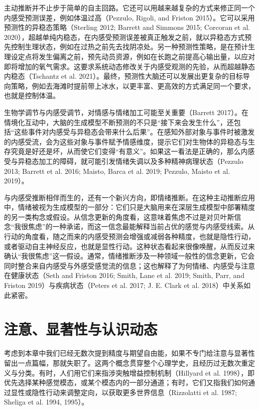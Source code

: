 主动推断并不止步于简单的自主回路。它还可以用越来越复杂的方式来修正同一个内感受预测误差，例如体温过高（Pezzulo, Rigoli, and Friston 2015）。它可以采用预测性的异稳态策略（Sterling 2012; Barrett and Simmons 2015; Corcoran et al. 2020），超越单纯内稳态，在内感受预测误差被真正触发之前，就以异稳态方式预先控制生理状态，例如在过热之前先去找阴凉处。另一种预测性策略，是在预计生理设定点将发生偏离之前，预先动员资源，例如在长跑之前提高心输出量，以应对即将增加的氧气需求。这要求系统动态修改关于内感受观测的先验，从而超越静态内稳态（Tschantz et al. 2021）。最终，预测性大脑还可以发展出更复杂的目标导向策略，例如去海滩时提前带上冰水，以更丰富、更高效的方式满足同一个要求，也就是控制体温。

生物学调节与内感受调节，对情感与情绪加工可能至关重要（Barrett 2017）。在情境化互动中，大脑的生成模型不断预测的不只是“接下来会发生什么”，还包括“这些事件对内感受与异稳态会带来什么后果”。在感知外部对象与事件时被激发的内感受流，会为这些对象与事件赋予情感维度，提示它们对生物体的异稳态与生存究竟是好还是坏，从而使它们变得“有意义”。如果这一看法是正确的，那么内感受与异稳态加工的障碍，就可能引发情绪失调以及多种精神病理状态（Pezzulo 2013; Barrett et al. 2016; Maisto, Barca et al. 2019; Pezzulo, Maisto et al. 2019）。

与内感受推断相伴而生的，还有一个新兴方向，即情绪推断。在这种主动推断应用中，情绪被视为生成模型的一部分：它们只是大脑用来在深层生成模型中部署精度的另一类构念或假设。从信念更新的角度看，这意味着焦虑不过是对贝叶斯信念“我很焦虑”的一种承诺，而这一信念最能解释当前占优的感觉与内感受线索。从行动的角度看，随之而来的内感受预测会增强或减弱各种精度，也就是隐性行动，或者驱动自主神经反应，也就是显性行动。这种状态看起来很像唤醒，从而反过来确认“我很焦虑”这一假设。通常，情绪推断涉及一种领域一般性的信念更新，它会同时整合来自内感受与外感受感觉流的信息；这也解释了为何情绪、内感受与注意在健康状态（Seth and Friston 2016; Smith, Lane et al. 2019; Smith, Parr, and Friston 2019）与疾病状态（Peters et al. 2017; J. E. Clark et al. 2018）中关系如此紧密。

\section{注意、显著性与认识动态}

考虑到本章中我们已经无数次提到精度与期望自由能，如果不专门给注意与显著性留出一点篇幅，那就失职了。这两个概念贯穿整个心理学史，且经历过无数次重定义与分类。有时，人们用它们来指涉突触增益控制机制（Hillyard et al. 1998），即优先选择某种感觉模态，或某个模态内的一部分通道；有时，它们又指我们如何通过显性或隐性行动来调整定向，以获取更多世界信息（Rizzolatti et al. 1987; Sheliga et al. 1994, 1995）。

